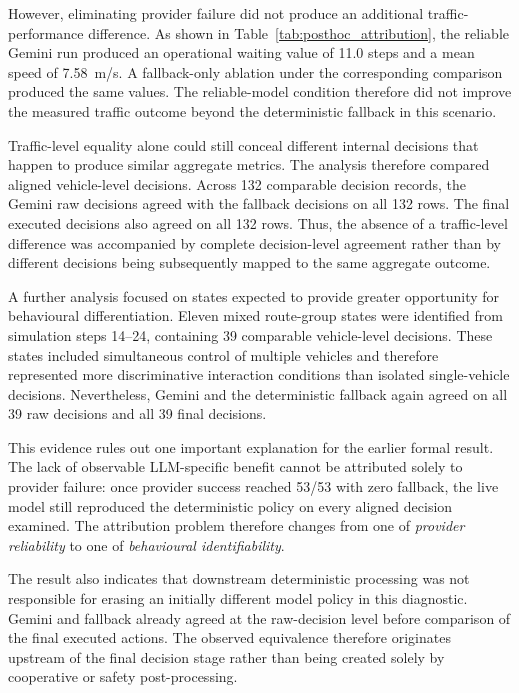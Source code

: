 \documentclass[letterpaper,10pt,conference]{ieeeconf}
\begin{document}
However, eliminating provider failure did not produce an additional traffic-performance difference. As shown in Table~\ref{tab:posthoc_attribution}, the reliable Gemini run produced an operational waiting value of 11.0 steps and a mean speed of 7.58~m/s. A fallback-only ablation under the corresponding comparison produced the same values. The reliable-model condition therefore did not improve the measured traffic outcome beyond the deterministic fallback in this scenario.



Traffic-level equality alone could still conceal different internal decisions that happen to produce similar aggregate metrics. The analysis therefore compared aligned vehicle-level decisions. Across 132 comparable decision records, the Gemini raw decisions agreed with the fallback decisions on all 132 rows. The final executed decisions also agreed on all 132 rows. Thus, the absence of a traffic-level difference was accompanied by complete decision-level agreement rather than by different decisions being subsequently mapped to the same aggregate outcome.



A further analysis focused on states expected to provide greater opportunity for behavioural differentiation. Eleven mixed route-group states were identified from simulation steps 14--24, containing 39 comparable vehicle-level decisions. These states included simultaneous control of multiple vehicles and therefore represented more discriminative interaction conditions than isolated single-vehicle decisions. Nevertheless, Gemini and the deterministic fallback again agreed on all 39 raw decisions and all 39 final decisions.



This evidence rules out one important explanation for the earlier formal result. The lack of observable LLM-specific benefit cannot be attributed solely to provider failure: once provider success reached 53/53 with zero fallback, the live model still reproduced the deterministic policy on every aligned decision examined. The attribution problem therefore changes from one of \emph{provider reliability} to one of \emph{behavioural identifiability}.



The result also indicates that downstream deterministic processing was not responsible for erasing an initially different model policy in this diagnostic. Gemini and fallback already agreed at the raw-decision level before comparison of the final executed actions. The observed equivalence therefore originates upstream of the final decision stage rather than being created solely by cooperative or safety post-processing.
\end{document}
